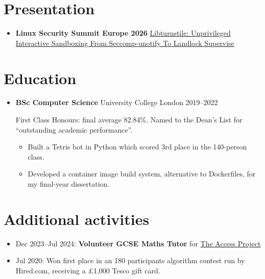   \section{Presentation}

  \begin{itemize}
    \item \textbf{Linux Security Summit Europe 2026} \dashdiv{} \href{https://youtu.be/cCfP9cwRdD8}{\color{link}
Libturnstile: Unprivileged Interactive Sandboxing From Seccomp-unotify To Landlock Supervise}
  \end{itemize}

  \section{Education}

  \begin{itemize}
    \item \textbf{BSc Computer Science} \dashdiv{} University College London \dashdiv{} 2019--2022

      First Class Honours: final average 82.84\%. Named to the Dean's List for ``outstanding academic performance''.

      \begin{itemize}
        \item Built a Tetris bot in Python which scored 3rd place in the 140-person class.
        \item Developed a container image build system, alternative to Dockerfiles, for my final-year dissertation.
      \end{itemize}
  \end{itemize}

  \section{Additional activities}

  \begin{itemize}
    \item Dec 2023--Jul 2024: \textbf{Volunteer GCSE Maths Tutor} for \href{https://www.theaccessproject.org.uk}{\color{link}The Access Project}
    \item Jul 2020: Won first place in an 180 participants algorithm contest run by Hired.com, receiving a £1,000 Tesco gift card.
  \end{itemize}

